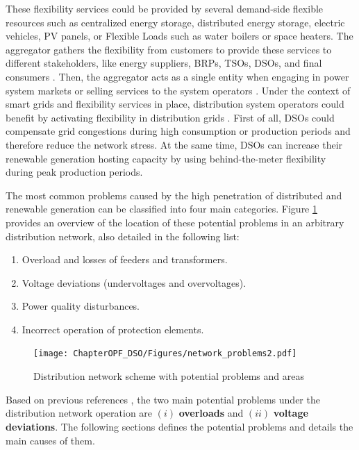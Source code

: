 These flexibility services could be provided by several demand-side flexible resources such as centralized energy storage, distributed energy storage, electric vehicles, PV panels, or Flexible Loads such as water boilers or space heaters. The aggregator gathers the flexibility from customers to provide these services to different stakeholders, like energy suppliers, BRPs, TSOs, DSOs, and final consumers \cite{USEFFoundation2015a, Olivella2018}. Then, the aggregator acts as a single entity when engaging in power system markets or selling services to the system operators \cite{BURGER2017}. Under the context of smart grids and flexibility services in place, distribution system operators could benefit by activating flexibility in distribution grids \cite{USEFFoundation2015a, spiliotis2016demand, esmat2016conf, hashemi2016}. First of all, DSOs could compensate grid congestions during high consumption or production periods and therefore reduce the network stress. At the same time, DSOs can increase their renewable generation hosting capacity by using behind-the-meter flexibility during peak production periods. 

The most common problems caused by the high penetration of distributed and renewable generation can be classified into four main categories. Figure \ref{fig:network_problems} provides an overview of the location of these potential problems in an arbitrary distribution network, also detailed in the following list:  

\begin{enumerate}
\item Overload and losses of feeders and transformers. 
\item Voltage deviations (undervoltages and overvoltages).
\item Power quality disturbances.
\item Incorrect operation of protection elements. 
\end{enumerate}

\begin{figure}[h]
	\centering
	\texttt{[image: ChapterOPF\_DSO/Figures/network\_problems2.pdf]}
		\caption{Distribution network scheme with potential problems and areas}
	\label{fig:network_problems}  
\end{figure}

Based on previous references \cite{ISMAEL20191002, Bollen2011}, the two main potential problems under the distribution network operation are $(i)$ \textbf{overloads} and  $(ii)$ \textbf{voltage deviations}. The following sections defines the potential problems and details the main causes of them. 


